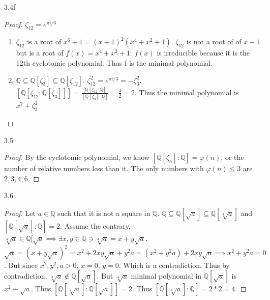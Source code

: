 \documentclass{article}
\newcommand{\Q}{\mathbb{Q}}
\begin{document}
\begin{PROB}{3.4f}\label{Problem 3.4f.}
\end{PROB}
\begin{proof}
    $\zeta_{12} = e^{\pi i / 6}$
    \begin{enumerate}
        \item $\zeta_{12}$ is a root of $x^6 + 1 = (x + 1)^2(x^4 + x^2 + 1)$. $\zeta_{12}$ is not a root of of $x - 1$ but is a root of $f(x) = x^4 + x^2 + 1$. $f(x)$ is irreducible because it is the 12th cyclotomic polynomial. Thus f is the minimal polynomial. 
        \item $\Q \subseteq \Q[\zeta_3] \subseteq \Q[\zeta_{12}]$. $\zeta_{12}^2 = e^{\pi i / 3} = -\zeta_3^2$. $[\Q[\zeta_{12} : \Q[\zeta_3]]] = \frac{[\Q[\zeta_{12} : \Q]}{[\Q[\zeta_3] : \Q]} = \frac{4}{2} = 2$. Thus the minimal polynomial is $x^2 + \zeta_3^2$  
    \end{enumerate}
\end{proof}

\bigskip

\begin{PROB}{3.5}\label{Problem 3.5.}
\end{PROB}
\begin{proof}
    By the cyclotomic polynomial, we know $[\Q[\zeta_n] : \Q] = \varphi(n)$, or the number of relative numbers less than it. The only numbers with $\varphi(n) \leq 3$ are $2, 3, 4, 6$.   
\end{proof}

\bigskip

\begin{PROB}{3.6}\label{Problem 3.6.}
\end{PROB}
\begin{proof}
    Let $a \in \Q$ such that it is not a square in $\Q$. $\Q \subseteq \Q[\sqrt{a}] \subseteq \Q[\sqrt[4]{a}]$ and $[\Q[\sqrt{a}] : \Q] = 2$. Assume the contrary, $\sqrt[4]{a} \in \Q[\sqrt{a} \implies \exists x, y \in \Q \ni \sqrt[4]{a} = x + y\sqrt{a}$. $\sqrt{a} = (x + y\sqrt{a})^2 = x^2 + 2xy\sqrt{a} + y^2a = (x^2 + y^2a) + 2xy\sqrt{a} \implies x^2 + y^2a = 0$. But since $x^2, y^2, a > 0$, $x = 0$, $y = 0$. Which is a contradiction. Thus by contradiction, $\sqrt[4]{a} \not \in \Q[\sqrt{a}]$. But $\sqrt[4]{a}$ minimal polynomial in $\Q[\sqrt{a}]$ is $x^2  - \sqrt{a}$. Thus $[\Q[\sqrt[4]{a}] : \Q[\sqrt{a}]] = 2$. Thus $[\Q[\sqrt[4]{a}] : \Q] = 2 * 2 = 4$.                
\end{proof}

\bigskip
\end{document}
